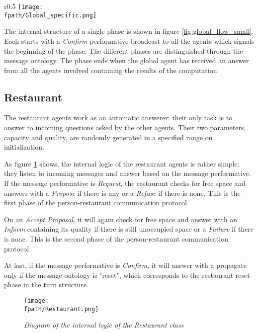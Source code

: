\documentclass[10pt,a4paper,usenatbib]{article}
\newcommand{\fpath}{./Figs/}
\begin{document}
\begin{wrapfigure}{r}{0.5\textwidth}
\centering
\texttt{[image: \\fpath/Global\_specific.png]}
\caption{\small \textit{Diagram of the internal logic of a phase of the Global class logic}}
\label{fig:global_flow_small}
\end{wrapfigure}

The internal structure of a single phase is shown in figure \ref{fig:global_flow_small}. Each starts with a \textit{Confirm} performative broadcast to all the agents which signals the beginning of the phase. The different phases are distinguished through the message ontology. The phase ends when the global agent has received an answer from all the agents involved containing the results of the computation.


\pagebreak

\subsection{Restaurant}
The restaurant agents work as an automatic answerer: their only task is to answer to incoming questions asked by the other agents. Their two parameters, capacity and quality, are randomly generated in a specified range on initialization.

As figure \ref{fig:restaurant_flow} shows, the internal logic of the restaurant agents is rather simple: they listen to incoming messages and answer based on the message performative. If the message performative is \textit{Request}, the restaurant checks for free space and answers with a \textit{Propose} if there is any or a \textit{Refuse} if there is none. This is the first phase of the person-restaurant communication protocol.

On an \textit{Accept Proposal}, it will again check for free space and answer with an \textit{Inform} containing its quality if there is still unoccupied space or a \textit{Failure} if there is none. This is the second phase of the person-restaurant communication protocol. 

At last, if the message performative is \textit{Confirm}, it will answer with a propagate only if the message ontology is "reset", which corresponds to the restaurant reset phase in the turn structure.
\begin{figure}
\texttt{[image: \\fpath/Restaurant.png]}
\caption{\small \textit{Diagram of the internal logic of the Restaurant class}}
\label{fig:restaurant_flow}
\end{figure}
\end{document}
